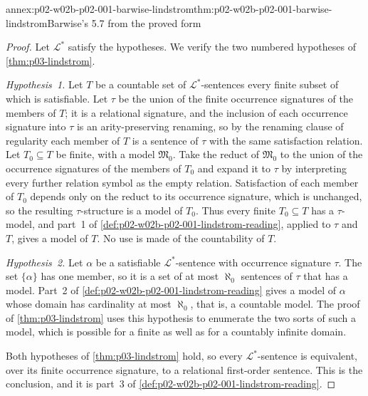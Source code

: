 \begin{annexitem}{annex:p02-w02b-p02-001-barwise-lindstrom}{thm:p02-w02b-p02-001-barwise-lindstrom}{Barwise's 5.7 from the proved form}
\begin{proof}
Let \(\mathcal L^{\ast}\) satisfy the hypotheses.  We verify the two
numbered hypotheses of \cref{thm:p03-lindstrom}.

\emph{Hypothesis~1.}  Let \(T\) be a countable set of
\(\mathcal L^{\ast}\)-sentences every finite subset of which is
satisfiable.  Let \(\tau\) be the union of the finite occurrence signatures
of the members of \(T\); it is a relational signature, and the inclusion of
each occurrence signature into \(\tau\) is an arity-preserving renaming, so
by the renaming clause of regularity each member of \(T\) is a sentence of
\(\tau\) with the same satisfaction relation.  Let \(T_0\subseteq T\) be
finite, with a model \(\mathfrak M_0\).  Take the reduct of
\(\mathfrak M_0\) to the union of the occurrence signatures of the members
of \(T_0\) and expand it to \(\tau\) by interpreting every further
relation symbol as the empty relation.  Satisfaction of each member of
\(T_0\) depends only on the reduct to its occurrence signature, which is
unchanged, so the resulting \(\tau\)-structure is a model of \(T_0\).  Thus
every finite \(T_0\subseteq T\) has a \(\tau\)-model, and part~1 of
\cref{def:p02-w02b-p02-001-lindstrom-reading}, applied to \(\tau\) and
\(T\), gives a model of \(T\).  No use is made of the countability of
\(T\).

\emph{Hypothesis~2.}  Let \(\alpha\) be a satisfiable
\(\mathcal L^{\ast}\)-sentence with occurrence signature \(\tau\).  The set
\(\{\alpha\}\) has one member, so it is a set of at most \(\aleph_0\)
sentences of \(\tau\) that has a model.  Part~2 of
\cref{def:p02-w02b-p02-001-lindstrom-reading} gives a model of \(\alpha\)
whose domain has cardinality at most \(\aleph_0\), that is, a countable
model.  The proof of \cref{thm:p03-lindstrom} uses this hypothesis to
enumerate the two sorts of such a model, which is possible for a finite as
well as for a countably infinite domain.

Both hypotheses of \cref{thm:p03-lindstrom} hold, so every
\(\mathcal L^{\ast}\)-sentence is equivalent, over its finite occurrence
signature, to a relational first-order sentence.  This is the conclusion,
and it is part~3 of \cref{def:p02-w02b-p02-001-lindstrom-reading}.
\end{proof}
\end{annexitem}

